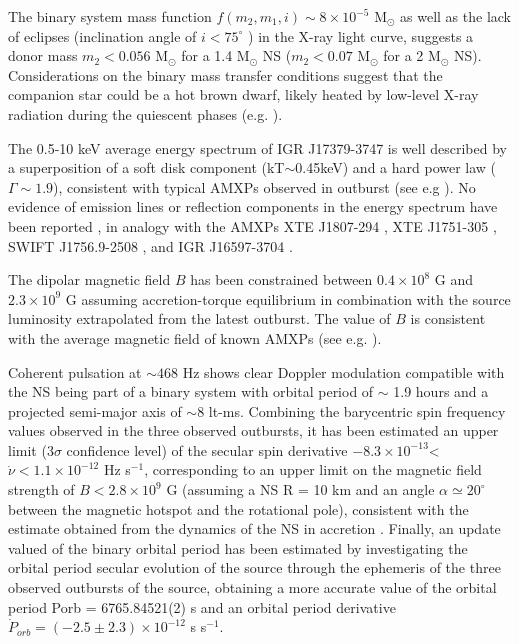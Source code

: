 \documentclass[graybox]{svmult}
\begin{document}
The binary system mass function $f(m_2 , m_1 , i) \sim 8\times 10^{-5}$ M$_{\odot}$ as well as the lack of eclipses (inclination angle of $i<75^\circ$ ) in the X-ray light curve, suggests a donor mass $m_2 < 0.056$ M$_\odot$ for a 1.4 M$_\odot$ NS ($m_2< 0.07$ M$_\odot$ for a 2 M$_\odot$ NS). Considerations on the binary mass transfer conditions suggest that the companion star could be a hot brown dwarf, likely heated by low-level X-ray radiation during the quiescent phases (e.g. \cite{Sanna2018b,Bildsten2001,Galloway2005b}). 

The 0.5-10 keV average energy spectrum of IGR J17379-3747 is well described by a superposition of a soft disk component (kT$\sim$0.45keV) and a hard power law ($\Gamma\sim1.9$), consistent with typical AMXPs observed in outburst (see e.g \cite{Gierlinski2005,Papitto2009,Falanga2012}). No evidence of emission lines or reflection components in the energy spectrum have been reported \cite{Sanna2018b}, in analogy with the AMXPs XTE J1807-294 \cite{Falanga2005a}, XTE J1751-305 \cite{Miller2003}, SWIFT J1756.9-2508 \cite{Sanna2018d}, and IGR J16597-3704 
\cite{Sanna2018a}. 

The dipolar magnetic field $B$ has been constrained between $0.4\times 10^{8}$ G and $2.3\times 10^{9}$ G assuming accretion-torque equilibrium in combination with the source luminosity extrapolated from the latest outburst. The value of $B$ is consistent with the average magnetic field of known AMXPs (see e.g. \cite{Mukherjee2015,Degenaar2017}).

Coherent pulsation at $\sim 468$ Hz shows clear Doppler modulation compatible with the NS being part of a binary system with orbital period of $\sim$ 1.9 hours and a projected semi-major axis of $\sim8$ lt-ms. Combining the barycentric spin frequency values observed in the three observed outbursts, it has been estimated an upper limit (3$\sigma$ confidence level) of the secular spin derivative $-8.3\times 10^{-13}$< $\dot{\nu}< 1.1\times 10^{-12}$ Hz s$^{-1}$, corresponding to an upper limit on the magnetic field strength of $B < 2.8\times 10^{9}$ G (assuming a NS R = 10 km and an angle $\alpha\simeq20^{\circ}$ between the magnetic hotspot and the rotational pole), consistent with the estimate obtained from the dynamics of the NS in accretion \cite{Sanna2018b}.
Finally, an update valued of the binary orbital period has been estimated by investigating the orbital period secular evolution of the source through the ephemeris of the three observed outbursts of the source, obtaining a more accurate value of the orbital period Porb = 6765.84521(2) s and an orbital period derivative $\dot{P}_{orb} = (-2.5\pm 2.3)\times 10^{-12}$ s s$^{-1}$.
\end{document}
